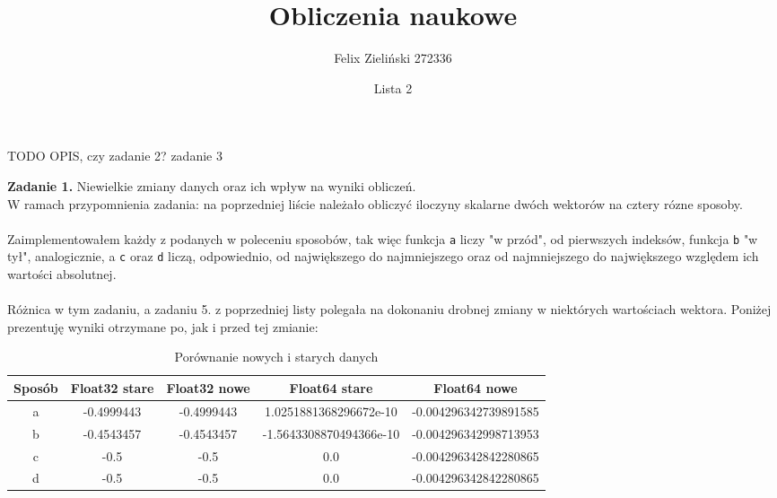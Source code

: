 \documentclass[15pt, a4paper]{article}
\title{Obliczenia naukowe}
\author{Felix Zieliński 272336}
\date{Lista 2}
\begin{document}
\maketitle
TODO OPIS, czy zadanie 2? zadanie 3

\vspace{0.5cm}

\noindent\hrulefill


\vspace{0.5cm}

\noindent\textbf{Zadanie 1.} Niewielkie zmiany danych oraz ich wpływ na wyniki obliczeń.\\

\noindent W ramach przypomnienia zadania: na poprzedniej liście  należało obliczyć iloczyny skalarne dwóch wektorów na cztery rózne sposoby.\\\\
Zaimplementowałem każdy z podanych w poleceniu sposobów, tak więc funkcja \verb|a| liczy "w przód", od pierwszych indeksów, funkcja \verb|b| "w tył", analogicznie, a \verb|c| oraz \verb|d| liczą, odpowiednio, od największego do najmniejszego oraz od najmniejszego do największego względem ich wartości absolutnej.\\\\
Różnica w tym zadaniu, a zadaniu 5. z poprzedniej listy polegała na dokonaniu drobnej zmiany w niektórych wartościach wektora. Poniżej prezentuję wyniki otrzymane po, jak i przed tej zmianie:


\begin{table}[ht]
    \begin{adjustbox}{max width=\textwidth}
    \begin{tabular}{|c|c|c|c|c|}
        \hline 
        Sposób & Float32 stare & Float32 nowe & Float64 stare & Float64 nowe \\ \hline
        a & -0.4999443 & -0.4999443 & 1.0251881368296672e-10 & -0.004296342739891585 \\ \hline
        b & -0.4543457 & -0.4543457 & -1.5643308870494366e-10 & -0.004296342998713953 \\ \hline
        c & -0.5 & -0.5 & 0.0 & -0.004296342842280865 \\ \hline
        d & -0.5 & -0.5 & 0.0 & -0.004296342842280865 \\ \hline
    \end{tabular}
    \end{adjustbox}
    \caption{Porównanie nowych i starych danych}
    \label{tab:products}
\end{table}
\end{document}
